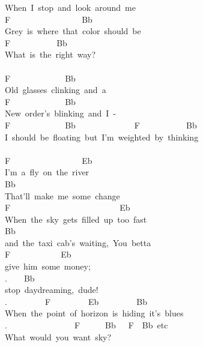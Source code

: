{When\ I\ stop\ and\ look\ around\ me\\
F\ \ \ \ \ \ \ \ \ \ \ \ \ \ \ \ \ Bb\\
Grey\ is\ where\ that\ color\ should\ be\\
F\ \ \ \ \ \ \ \ \ \ \ Bb\\
What\ is\ the\ right\ way?\\
\\
F\ \ \ \ \ \ \ \ \ \ \ \ \ Bb\\
Old\ glasses\ clinking\ and\ a\\
F\ \ \ \ \ \ \ \ \ \ \ \ \ Bb\\
New\ order's\ blinking\ and\ I\ -\\
F\ \ \ \ \ \ \ \ \ \ \ \ \ Bb\ \ \ \ \ \ \ \ \ \ \ \ \ \ F\ \ \ \ \ \ \ \ \ \ \ Bb\\
I\ should\ be\ floating\ but\ I'm\ weighted\ by\ thinking\\
\\
F\ \ \ \ \ \ \ \ \ \ \ \ \ \ \ \ \ Eb\\
I'm\ a\ fly\ on\ the\ river\\
Bb\\
That'll\ make\ me\ some\ change\\
F\ \ \ \ \ \ \ \ \ \ \ \ \ \ \ \ \ \ \ \ \ \ \ \ \ \ Eb\\
When\ the\ sky\ gets\ filled\ up\ too\ fast\\
Bb\\
and\ the\ taxi\ cab's\ waiting,\ \;You\ betta\\
F\ \ \ \ \ \ \ \ \ \ \ \ Eb\\
give\ him\ some\ money;\\
.\ \ \ \ Bb\\
stop\ daydreaming,\ dude!\;\\
.\ \ \ \ \ \ \ \ \ F\ \ \ \ \ \ \ \ \ Eb\ \ \ \ \ \ \ \ \ Bb\\
When\ the\ point\ of\ horizon\ is\ hiding\ it's\ blues\\
.\ \ \ \ \ \ \ \ \ \ \ \ \ \ \ \ F\ \ \ \ \ \ Bb\ \ \ F\ \ Bb\ etc\\
What\ would\ you\ want\ sky?}
